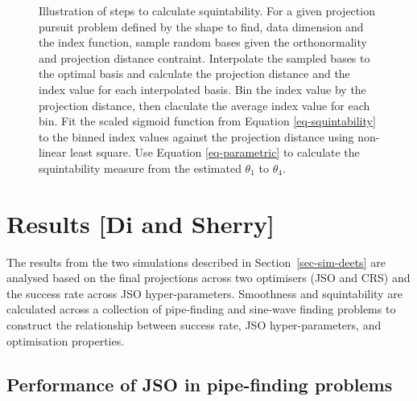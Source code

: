 \documentclass[
  number,
  preprint,
  3p]{elsarticle}
\begin{document}
\begin{figure}


\caption{\label{fig-squintability}Illustration of steps to calculate
squintability. For a given projection pursuit problem defined by the
shape to find, data dimension and the index function, sample random
bases given the orthonormality and projection distance contraint.
Interpolate the sampled bases to the optimal basis and calculate the
projection distance and the index value for each interpolated basis. Bin
the index value by the projection distance, then claculate the average
index value for each bin. Fit the scaled sigmoid function from Equation
\ref{eq-squintability} to the binned index values against the projection
distance using non-linear least square. Use Equation \ref{eq-parametric}
to calculate the squintability measure from the estimated \(\theta_1\)
to \(\theta_4\).}

\end{figure}%

\section{Results {[}Di and Sherry{]}}\label{sec-sim-res}

The results from the two simulations described in
Section~\ref{sec-sim-deets} are analysed based on the final projections
across two optimisers (JSO and CRS) and the success rate across JSO
hyper-parameters. Smoothness and squintability are calculated across a
collection of pipe-finding and sine-wave finding problems to construct
the relationship between success rate, JSO hyper-parameters, and
optimisation properties.

\subsection{Performance of JSO in pipe-finding
problems}\label{sec-app-1}
\end{document}
